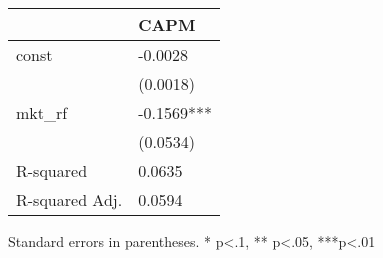 \begin{table}
\caption{}
\label{}
\begin{center}
\begin{tabular}{ll}
\hline
               & CAPM        \\
\hline
const          & -0.0028     \\
               & (0.0018)    \\
mkt\_rf        & -0.1569***  \\
               & (0.0534)    \\
R-squared      & 0.0635      \\
R-squared Adj. & 0.0594      \\
\hline
\end{tabular}
\end{center}
\end{table}
\bigskip
Standard errors in parentheses. \newline 
* p<.1, ** p<.05, ***p<.01